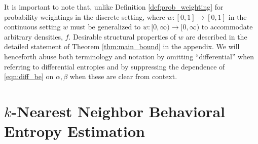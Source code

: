%
It is important to note that, unlike Definition \ref{def:prob_weighting} for probability weightings in the discrete setting, where $w : [0, 1] \rightarrow [0, 1]$ in the continuous setting $w$ must be generalized to $w : [0, \infty) \rightarrow [0, \infty)$ to accommodate arbitrary densities, $f$. Desirable structural properties of $w$ are described in the detailed statement of Theorem \ref{thm:main_bound} in the appendix. 
%
We will henceforth abuse both terminology and notation by omitting ``differential'' when referring to differential entropies and by suppressing the dependence of \eqref{eqn:diff_be} on $\alpha, \beta$ when these are clear from context.



\section{$k$-Nearest Neighbor Behavioral Entropy Estimation}

